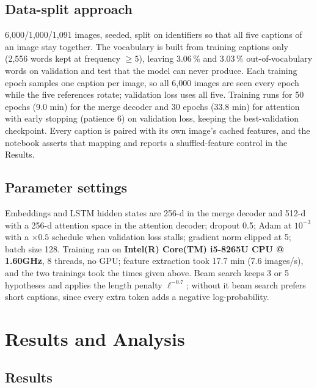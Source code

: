 \documentclass[10pt,conference]{IEEEtran}
\begin{document}
\subsection{Data-split approach}
6,000/1,000/1,091 images, seeded, split on identifiers so that all
five captions of an image stay together. The vocabulary is built from training captions only
(2,556 words kept at frequency $\geq5$), leaving 3.06\,\%
and 3.03\,\% out-of-vocabulary words on validation and test that the model can
never produce. Each training epoch samples one caption per image, so all 6,000 images are
seen every epoch while the five references rotate; validation loss uses all five. Training runs for
50 epochs (9.0 min) for the merge decoder and 30 epochs (33.8 min) for attention with early stopping (patience 6) on validation loss, keeping the best-validation checkpoint.
Every caption is paired with its own image's cached features, and the notebook asserts that mapping
and reports a shuffled-feature control in the Results.

\subsection{Parameter settings}
Embeddings and LSTM hidden states are 256-d in the merge decoder and 512-d with a 256-d attention
space in the attention decoder; dropout 0.5; Adam at $10^{-3}$ with a $\times 0.5$ schedule when
validation loss stalls; gradient norm clipped at 5; batch size 128. Training ran on
\textbf{Intel(R) Core(TM) i5-8265U CPU @ 1.60GHz}, 8 threads, no GPU; feature extraction took
17.7 min (7.6 images/s), and the two
trainings took the times given above. Beam search keeps 3 or 5 hypotheses and applies the length
penalty $\ell^{-0.7}$; without it beam search prefers short captions, since every extra token adds
a negative log-probability.

\section{Results and Analysis}
\subsection{Results}
\end{document}
